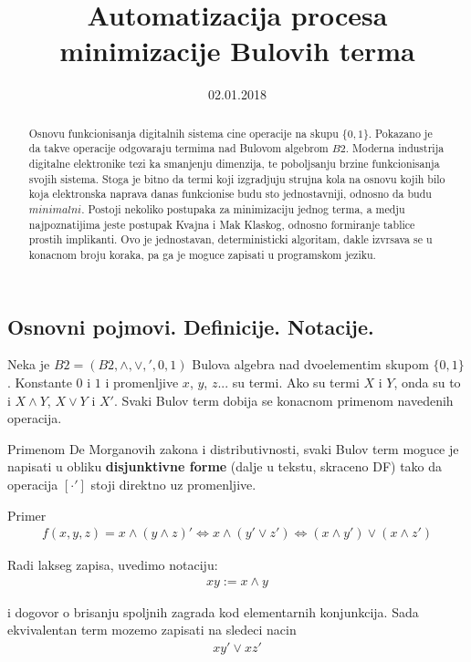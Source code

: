 \documentclass{article}
\title{Automatizacija procesa minimizacije Bulovih terma}
\date{02.01.2018}
\begin{document}
\maketitle
\begin{abstract}
Osnovu funkcionisanja digitalnih sistema cine operacije na skupu $\{0, 1\}$. Pokazano je da takve operacije odgovaraju termima nad Bulovom algebrom $B2$. Moderna industrija digitalne elektronike tezi ka smanjenju dimenzija, te poboljsanju brzine funkcionisanja svojih sistema. Stoga je bitno da termi koji izgradjuju strujna kola na osnovu kojih bilo koja elektronska naprava danas funkcionise budu sto jednostavniji, odnosno da budu $minimalni$. Postoji nekoliko postupaka za minimizaciju jednog terma, a medju najpoznatijima jeste postupak Kvajna i Mak Klaskog, odnosno formiranje tablice prostih implikanti. Ovo je jednostavan, deterministicki algoritam, dakle izvrsava se u konacnom broju koraka, pa ga je moguce zapisati u programskom jeziku.
\end{abstract}

\subsection{Osnovni pojmovi. Definicije. Notacije.}
Neka je $B2 = (B2, \wedge, \vee, ', 0, 1)$ Bulova algebra \cite{balgebradef} nad dvoelementim skupom $\{0, 1\}$. Konstante $0$ i $1$ i promenljive $x$, $y$, $z$... su termi. Ako su termi $X$ i $Y$, onda su to i $X \wedge Y$, $X \vee Y$ i $X'$. Svaki Bulov term dobija se konacnom primenom navedenih operacija.

Primenom De Morganovih zakona i distributivnosti, svaki Bulov term moguce je napisati u obliku \textbf{disjunktivne forme} (dalje u tekstu, skraceno DF) tako da operacija $[\cdot ']$ stoji direktno uz promenljive. \cite{df}

Primer
\begin{align*}
	f(x, y, z) = x \wedge (y \wedge z)' \Leftrightarrow x \wedge (y' \vee z') \Leftrightarrow (x \wedge y') \vee (x \wedge z')
\end{align*}

Radi lakseg zapisa, uvedimo notaciju:
\begin{align*}
xy := x \wedge y
\end{align*}

i dogovor o brisanju spoljnih zagrada kod elementarnih konjunkcija. Sada ekvivalentan term mozemo zapisati na sledeci nacin
\begin{align*}
xy' \vee xz'
\end{align*}
\end{document}

